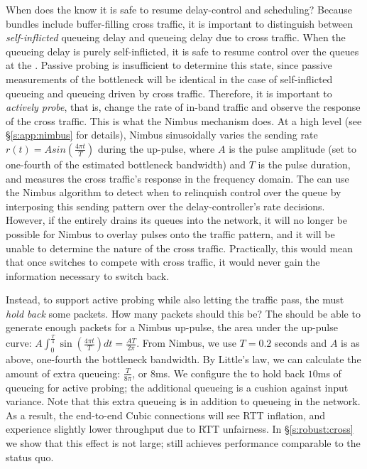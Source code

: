 When does the \inbox know it is safe to resume delay-control and scheduling?
Because bundles include buffer-filling cross traffic, it is important to distinguish between \emph{self-inflicted} queueing delay and queueing delay due to cross traffic.
When the queueing delay is purely self-inflicted, it is safe to resume control over the queues at the \inbox.
Passive probing is insufficient to determine this state, since passive measurements of the bottleneck will be identical in the case of self-inflicted queueing and queueing driven by cross traffic.
Therefore, it is important to \emph{actively probe}, that is, change the rate of in-band traffic and observe the response of the cross traffic. 
This is what the Nimbus mechanism does.
At a high level (see \S\ref{s:app:nimbus} for details),
Nimbus sinusoidally varies the sending rate $r(t) = A sin(\frac{4\pi{}t}{T})$ during the up-pulse, where $A$ is the pulse amplitude (set to one-fourth of the estimated bottleneck bandwidth) and $T$ is the pulse duration, and measures the cross traffic's response in the frequency domain.
The \inbox can use the Nimbus algorithm to detect when to relinquish control over the queue by interposing this sending pattern over the delay-controller's rate decisions.
However, if the \inbox entirely drains its queues into the network, it will no longer be possible for Nimbus to overlay pulses onto the traffic pattern, and it will be unable to determine the nature of the cross traffic.
Practically, this would mean that once \inbox switches to compete with cross traffic, it would never gain the information necessary to switch back.

Instead, to support active probing while also letting the traffic pass, the \inbox must \emph{hold back} some packets.
How many packets should this be? The \inbox should be able to generate enough packets for a Nimbus up-pulse, \ie the area under the up-pulse curve: 
$A \int_0^{\frac{T}{4}} \sin(\frac{4\pi{}t}{T}) dt = \frac{AT}{2\pi}$.
From Nimbus, we use $T = 0.2$ seconds and $A$ is as above, one-fourth the bottleneck bandwidth. By Little's law, we can calculate the amount of extra queueing: $\frac{T}{8\pi}$, or $8$ms.
We configure the \inbox to hold back $10$ms of queueing for active probing; the additional queueing is a cushion against input variance.
Note that this extra queueing is in addition to queueing in the network. As a result, the end-to-end Cubic connections will see RTT inflation, and experience slightly lower throughput due to RTT unfairness. 
In \S\ref{s:robust:cross} we show that this effect is not large; \name still achieves performance comparable to the status quo.

